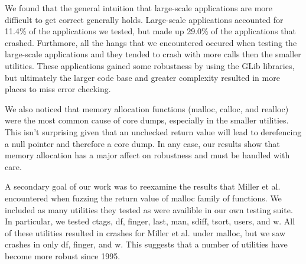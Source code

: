 We found that the general intuition that large-scale applications are more difficult to get correct generally holds. Large-scale applications accounted for 11.4\% of the applications we tested, but made up 29.0\% of the applications that crashed. Furthmore, all the hangs that we encountered occured when testing the large-scale applications and they tended to crash with more calls then the smaller utilities. These applications gained some robustness by using the GLib libraries, but ultimately the larger code base and greater complexity resulted in more places to miss error checking.

We also noticed that memory allocation functions (malloc, calloc, and realloc) were the most common cause of core dumps, especially in the smaller utilities. This isn't surprising given that an unchecked return value will lead to derefencing a null pointer and therefore a core dump. In any case, our results show that memory 
allocation has a major affect on robustness and must be handled with care.

A secondary goal of our work was to reexamine the results that Miller et al. encountered when fuzzing the return value of malloc family of functions. We included as many utilities they tested as were availible in our own testing suite. In particular, we tested ctags, df, finger, last, man, sdiff, tsort, users, and w. All of these utilities resulted in crashes for Miller et al. under malloc, but we saw crashes in only df, finger, and w. This suggests that a number of utilities have become more robust since 1995.  
